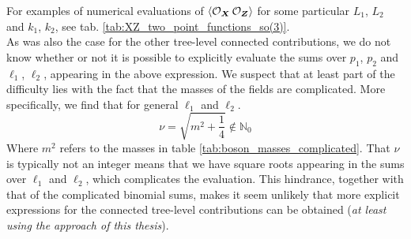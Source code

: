 %
%
For examples of numerical evaluations of $\expval{\mathcal{O}_{\boldsymbol{X}} \, \mathcal{O}_{\boldsymbol{Z}}}$ for some particular $L_1$, $L_2$ and $k_1$, $k_2$, see tab. \ref{tab:XZ_two_point_functions_so(3)}.\\
As was also the case for the other tree-level connected contributions, we do not know whether or not it is possible to explicitly evaluate the sums over $p_1$, $p_2$ and $\ell_1$, $\ell_2$, appearing in the above expression. We suspect that at least part of the difficulty lies with the fact that the masses of the fields are complicated. More specifically, we find that for general $\ell_1$ and $\ell_2$.
%
%
\begin{equation}
\nu = \sqrt{m^2 + \frac{1}{4}} \notin \mathbb{N}_0
\end{equation}
%
%
Where $m^2$ refers to the masses in table \ref{tab:boson_masses_complicated}. That $\nu$ is typically not an integer means that we have square roots appearing in the sums over $\ell_1$ and $\ell_2$, which complicates the evaluation. This hindrance, together with that of the complicated binomial sums, makes it seem unlikely that more explicit expressions for the connected tree-level contributions can be obtained (\textit{at least using the approach of this thesis}).\\
\\
